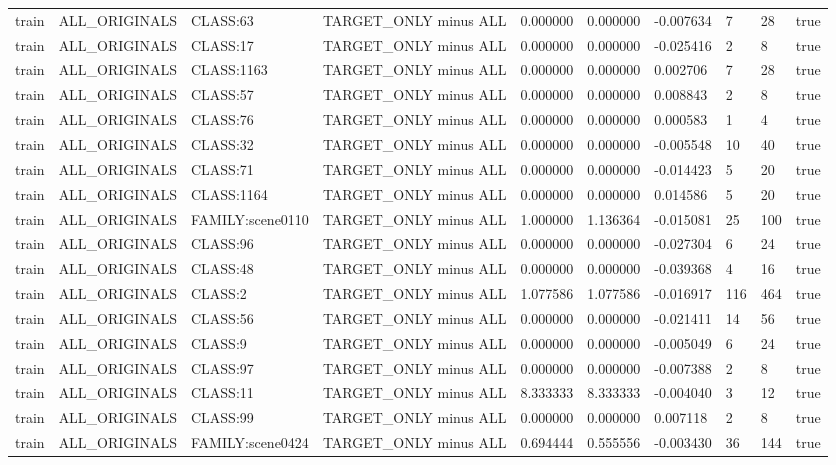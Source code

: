 \begin{tabular}{llllllllll}
train & ALL\_ORIGINALS & CLASS:63 & TARGET\_ONLY minus ALL & 0.000000 & 0.000000 & -0.007634 & 7 & 28 & true \\
train & ALL\_ORIGINALS & CLASS:17 & TARGET\_ONLY minus ALL & 0.000000 & 0.000000 & -0.025416 & 2 & 8 & true \\
train & ALL\_ORIGINALS & CLASS:1163 & TARGET\_ONLY minus ALL & 0.000000 & 0.000000 & 0.002706 & 7 & 28 & true \\
train & ALL\_ORIGINALS & CLASS:57 & TARGET\_ONLY minus ALL & 0.000000 & 0.000000 & 0.008843 & 2 & 8 & true \\
train & ALL\_ORIGINALS & CLASS:76 & TARGET\_ONLY minus ALL & 0.000000 & 0.000000 & 0.000583 & 1 & 4 & true \\
train & ALL\_ORIGINALS & CLASS:32 & TARGET\_ONLY minus ALL & 0.000000 & 0.000000 & -0.005548 & 10 & 40 & true \\
train & ALL\_ORIGINALS & CLASS:71 & TARGET\_ONLY minus ALL & 0.000000 & 0.000000 & -0.014423 & 5 & 20 & true \\
train & ALL\_ORIGINALS & CLASS:1164 & TARGET\_ONLY minus ALL & 0.000000 & 0.000000 & 0.014586 & 5 & 20 & true \\
train & ALL\_ORIGINALS & FAMILY:scene0110 & TARGET\_ONLY minus ALL & 1.000000 & 1.136364 & -0.015081 & 25 & 100 & true \\
train & ALL\_ORIGINALS & CLASS:96 & TARGET\_ONLY minus ALL & 0.000000 & 0.000000 & -0.027304 & 6 & 24 & true \\
train & ALL\_ORIGINALS & CLASS:48 & TARGET\_ONLY minus ALL & 0.000000 & 0.000000 & -0.039368 & 4 & 16 & true \\
train & ALL\_ORIGINALS & CLASS:2 & TARGET\_ONLY minus ALL & 1.077586 & 1.077586 & -0.016917 & 116 & 464 & true \\
train & ALL\_ORIGINALS & CLASS:56 & TARGET\_ONLY minus ALL & 0.000000 & 0.000000 & -0.021411 & 14 & 56 & true \\
train & ALL\_ORIGINALS & CLASS:9 & TARGET\_ONLY minus ALL & 0.000000 & 0.000000 & -0.005049 & 6 & 24 & true \\
train & ALL\_ORIGINALS & CLASS:97 & TARGET\_ONLY minus ALL & 0.000000 & 0.000000 & -0.007388 & 2 & 8 & true \\
train & ALL\_ORIGINALS & CLASS:11 & TARGET\_ONLY minus ALL & 8.333333 & 8.333333 & -0.004040 & 3 & 12 & true \\
train & ALL\_ORIGINALS & CLASS:99 & TARGET\_ONLY minus ALL & 0.000000 & 0.000000 & 0.007118 & 2 & 8 & true \\
train & ALL\_ORIGINALS & FAMILY:scene0424 & TARGET\_ONLY minus ALL & 0.694444 & 0.555556 & -0.003430 & 36 & 144 & true \\

\end{tabular}
